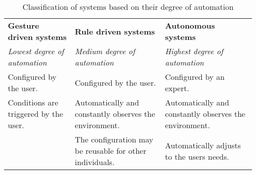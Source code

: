 \begin{table}[h]
    \centering
    \begin{tabularx}{\textwidth}{XXX}
    \textbf{Gesture driven systems}       & \textbf{Rule driven systems}                             & \textbf{Autonomous systems} \\
    \textit{Lowest degree of automation}  & \textit{Medium degree of automation}                     & \textit{Highest degree of automation}\\
    Configured by the user.               & Configured by the user.                                  & Configured by an expert.\\
    Conditions are triggered by the user. & Automatically and constantly observes the environment.   & Automatically and constantly observes the environment.\\
    ~                                     & The configuration may be reusable for other individuals. & Automatically adjusts to the users needs.\\
    \end{tabularx}
    \caption{Classification of systems based on their degree of automation}
    \label{tbl:system-categories}
\end{table}

